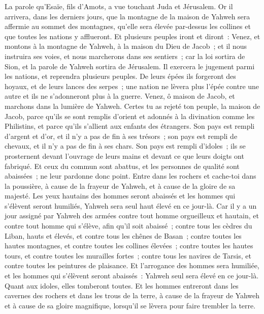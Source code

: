 \begin{multicols}{2}
\VerseOne{}La parole qu'Esaïe, fils d'Amots, a vue touchant Juda et Jérusalem.
Or il arrivera, dans les derniers jours, que la montagne de la maison de Yahweh sera affermie au sommet des montagnes, qu'elle sera élevée par-dessus les collines et que toutes les nations y afflueront.
Et plusieurs peuples iront et diront~: Venez, et montons à la montagne de Yahweh, à la maison du Dieu de Jacob~; et il nous instruira ses voies, et nous marcherons dans ses sentiers~; car la loi sortira de Sion, et la parole de Yahweh sortira de Jérusalem. 
Il exercera le jugement parmi les nations, et reprendra plusieurs peuples. De leurs épées ils forgeront des hoyaux, et de leurs lances des serpes~; une nation ne lèvera plus l'épée contre une autre et ils ne s'adonneront plus à la guerre.
Venez, ô maison de Jacob, et marchons dans la lumière de Yahweh.
Certes tu as rejeté ton peuple, la maison de Jacob, parce qu'ils se sont remplis d'orient et adonnés à la divination comme les Philistins, et parce qu'ils s'allient aux enfants des étrangers.
Son pays est rempli d'argent et d'or, et il n'y a pas de fin à ses trésors~; son pays est rempli de chevaux, et il n'y a pas de fin à ses chars.
Son pays est rempli d'idoles~; ils se prosternent devant l'ouvrage de leurs mains et devant ce que leurs doigts ont fabriqué.
Et ceux du commun sont abattus, et les personnes de qualité sont abaissées~; ne leur pardonne donc point.
Entre dans les rochers et cache-toi dans la poussière, à cause de la frayeur de Yahweh, et à cause de la gloire de sa majesté.
Les yeux hautains des hommes seront abaissés et les hommes qui s'élèvent seront humiliés, Yahweh sera seul haut élevé en ce jour-là.
Car il y a un jour assigné par Yahweh des armées contre tout homme orgueilleux et hautain, et contre tout homme qui s'élève, afin qu'il soit abaissé~;
contre tous les cèdres du Liban, hauts et élevés, et contre tous les chênes de Basan~;
contre toutes les hautes montagnes, et contre toutes les collines élevées~;
contre toutes les hautes tours, et contre toutes les murailles fortes~;
contre tous les navires de Tarsis, et contre toutes les peintures de plaisance.
Et l'arrogance des hommes sera humiliée, et les hommes qui s'élèvent seront abaissés~:
Yahweh seul sera élevé en ce jour-là. Quant aux idoles, elles tomberont toutes.
Et les hommes entreront dans les cavernes des rochers et dans les trous de la terre, à cause de la frayeur de Yahweh et à cause de sa gloire magnifique, lorsqu'il se lèvera pour faire trembler la terre.

\end{multicols}
